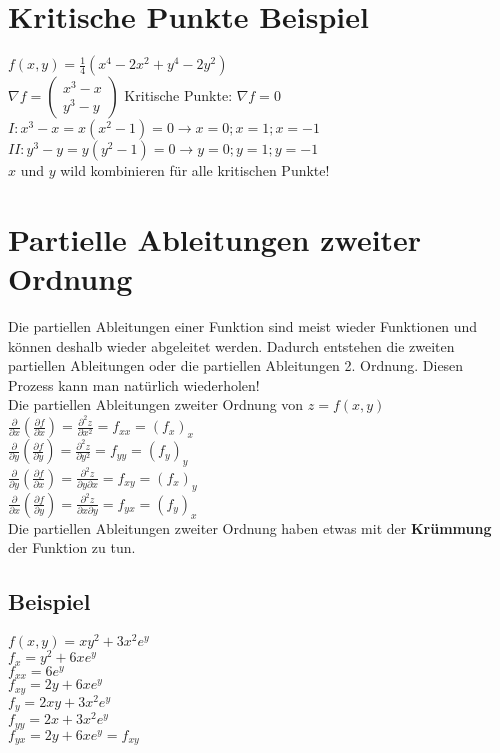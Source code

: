 \documentclass[../main.tex]{subfiles}
\begin{document}
\section{Kritische Punkte Beispiel}
$f(x,y)=\frac{1}{4}(x^4-2x^2+y^4-2y^2)$\\ [7pt]
$\nabla f=\begin{pmatrix}x^3-x\\y^3-y\end{pmatrix}$ Kritische Punkte: $\nabla f=0$ \\ [7pt]
$I: x^3-x = x(x^2-1) = 0 \longrightarrow x=0;x=1;x=-1$ \\ [7pt]
$II: y^3-y = y(y^2-1) = 0 \longrightarrow y=0;y=1;y=-1$ \\ [7pt]
$x$ und $y$ wild kombinieren für alle kritischen Punkte!

\section{Partielle Ableitungen zweiter Ordnung}
Die partiellen Ableitungen einer Funktion sind meist wieder Funktionen und können deshalb wieder abgeleitet werden. Dadurch
entstehen die zweiten partiellen Ableitungen oder die partiellen Ableitungen 2. Ordnung. Diesen Prozess kann man natürlich
wiederholen! \\ [7pt]
Die partiellen Ableitungen zweiter Ordnung von $z=f(x,y)$ \\ [7pt]
$\frac{\partial}{\partial x}(\frac{\partial f}{\partial x})=\frac{\partial^2z}{\partial x^2} = f_{xx} = (f_x)_x$ \\ [7pt]
$\frac{\partial}{\partial y}(\frac{\partial f}{\partial y})=\frac{\partial^2z}{\partial y^2} = f_{yy} = (f_y)_y$ \\ [7pt]
$\frac{\partial}{\partial y}(\frac{\partial f}{\partial x})=\frac{\partial^2z}{\partial y\partial x} = f_{xy} = (f_x)_y$ \\ [7pt]
$\frac{\partial}{\partial x}(\frac{\partial f}{\partial y})=\frac{\partial^2z}{\partial x\partial y} = f_{yx} = (f_y)_x$ \\ [7pt]
Die partiellen Ableitungen zweiter Ordnung haben etwas mit der \textbf{Krümmung} der Funktion zu tun.


\subsection{Beispiel}
$f(x,y)=xy^2+3x^2e^y$ \\ [7pt]
$f_x=y^2+6xe^y$ \\ [7pt]
$f_{xx}=6e^y$ \\ [7pt]
$f_{xy}=2y+6xe^y$ \\ [7pt]
$f_y=2xy+3x^2e^y$ \\ [7pt]
$f_{yy}=2x+3x^2e^y$ \\ [7pt]
$f_{yx}=2y+6xe^y = f_{xy}$ 
\end{document}
